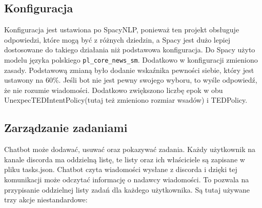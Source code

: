\documentclass{article}
\begin{document}
\subsection{Konfiguracja}
Konfiguracja jest ustawiona po SpacyNLP, ponieważ ten projekt obsługuje
odpowiedzi, które mogą być z różnych dziedzin, a Spacy jest dużo lepiej
dostosowane do takiego działania niż podstawowa konfiguracja. Do Spacy użyto
modelu języka polskiego \verb|pl_core_news_sm|. Dodatkowo w konfiguracji
zmieniono zasady. Podstawową zmianą było dodanie wskaźnika pewności siebie,
który jest ustawony na 60\%. Jeśli bot nie jest pewny swojego wyboru, to wyśle
odpowiedź, że nie rozumie wiadomości. Dodatkowo zwiększono liczbę epok w obu
UnexpecTEDIntentPolicy(tutaj też zmieniono rozmiar wsadów) i TEDPolicy.

\subsection{Zarządzanie zadaniami}
Chatbot może dodawać, usuwać oraz pokazywać zadania. Każdy użytkownik na kanale
discorda ma oddzielną listę, te listy oraz ich właściciele są zapisane w pliku
tasks.json. Chatbot czyta wiadomości wysłane z discorda i dzięki tej
komunikacji może odczytać informację o nadawcy wiadomości. To pozwala na
przypisanie oddzielnej listy zadań dla każdego użytkownika. Są tutaj używane
trzy akcje niestandardowe:
\end{document}
